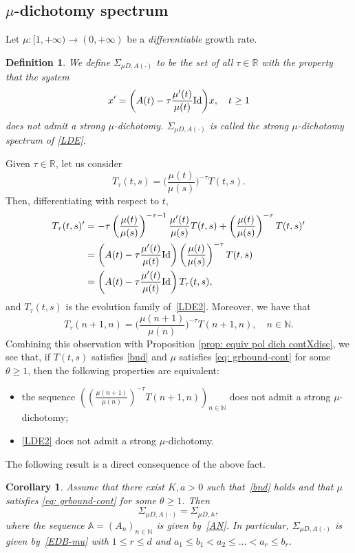 \documentclass[reqno, a4paper, 10pt]{amsart}
\theoremstyle{plain}
\numberwithin{equation}{section}
\newtheorem{corollary}{Corollary}
\newtheorem{definition}{Definition}
\theoremstyle{remark}
\def\N{\mathbb{N}}
\def\R{\mathbb{R}}
\def\Id{\text{\rm Id}}
\begin{document}
\subsection{$\mu$-dichotomy spectrum} Let $\mu\colon [1, +\infty)\to (0,+\infty)$ be a \emph{differentiable} growth rate.
\begin{definition}
  We define   $\Sigma_{\mu D, A(\cdot)}$ to be the set of all $\tau \in \R$ with the property that the system
\begin{equation}\label{LDE2}
x'=\bigg (A(t)-\tau \frac{\mu'(t)}{\mu(t)} \Id \bigg)x, \quad t\ge 1
\end{equation}
does not admit a strong $\mu$-dichotomy. $\Sigma_{\mu D, A(\cdot)}$ is called the \emph{strong $\mu$-dichotomy spectrum} of \eqref{LDE}.
\end{definition}


 
Given $\tau\in\R$, let us consider 
\[
T_\tau(t,s)=\bigg (\frac{\mu (t)}{\mu(s)}\bigg )^{-\tau}T(t,s).
\]
Then, differentiating with respect to $t$,
\[
\begin{split}
T_\tau(t,s)'
& =-\tau\left(\frac{\mu(t)}{\mu(s)}\right)^{-\tau-1}\frac{\mu'(t)}{\mu(s)}T(t,s)+\left(\frac{\mu(t)}{\mu(s)}\right)^{-\tau}T(t,s)'\\
& =\left(A(t)-\tau\frac{\mu'(t)}{\mu(t)}\Id \right)\left(\frac{\mu(t)}{\mu(s)}\right)^{-\tau}T(t,s)\\
& =\left(A(t)-\tau\frac{\mu'(t)}{\mu(t)}\Id\right)T_\tau(t,s),\\
\end{split}
\]
and $T_\tau(t,s)$ is the evolution family of~\eqref{LDE2}. Moreover, we have that
\[
T_\tau(n+1,n)=\bigg (\frac{\mu(n+1)}{\mu(n)}\bigg)^{-\tau}T(n+1,n), \quad n\in \N.
\]
Combining this observation with Proposition  \ref{prop: equiv pol dich contXdisc}, we see that, if $T(t,s)$ satisfies \eqref{bnd} and $\mu$ satisfies \eqref{eq: grbound-cont} for some $\theta\geq 1$, then the following properties are equivalent:
\begin{itemize}
\item the sequence $\left(\left(\frac{\mu(n+1)}{\mu(n)}\right)^{-\tau}T(n+1,n)\right)_{n\in \N}$ does not admit a strong $\mu$-dichotomy;
\item \eqref{LDE2} does not admit a strong $\mu$-dichotomy.
\end{itemize}


The following result is a direct consequence of the above fact.

\begin{corollary}\label{cor: equal spectrum cont}
Assume that there exist $K, a>0$ such that~\eqref{bnd} holds and that $\mu$ satisfies \eqref{eq: grbound-cont} for some $\theta\geq 1$. Then
\[
\Sigma_{\mu D, A(\cdot)}=\Sigma_{\mu D, \mathbb A},
\]
where the sequence $\mathbb A=(A_n)_{n\in \N}$ is given by~\eqref{AN}. In particular, $\Sigma_{\mu D, A(\cdot)}$ is given by~\eqref{EDB-mu} with $1\leq r\le d$ and $a_1\leq b_1<a_2\leq \ldots < a_r\leq b_r$.
\end{corollary}
\end{document}
